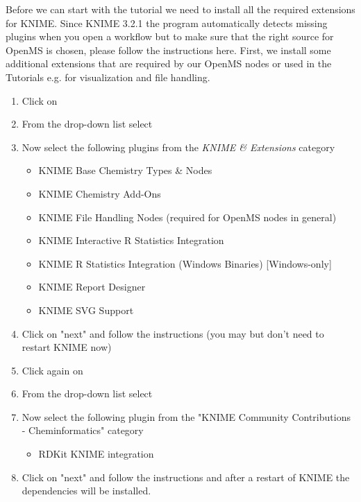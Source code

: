 Before we can start with the tutorial we need to install all the required extensions for KNIME. Since KNIME 3.2.1 the program automatically
detects missing plugins when you open a workflow but to make sure that the right source for OpenMS is chosen, please follow the instructions here.
First, we install some additional extensions that are required by our OpenMS nodes or used in the Tutorials e.g. for visualization and file handling.
\begin{enumerate}
\item Click on 
\item From the  drop-down list select \menu{\KnimeUpdateSite}
\item Now select the following plugins from the \textit{KNIME \& Extensions} category
    \begin{itemize}
    \item KNIME Base Chemistry Types \& Nodes
    \item KNIME Chemistry Add-Ons
    \item KNIME File Handling Nodes (required for OpenMS nodes in general)
    \item KNIME Interactive R Statistics Integration
    \item KNIME R Statistics Integration (Windows Binaries) [Windows-only]
    \item KNIME Report Designer
    \item KNIME SVG Support
    \end{itemize}
\item Click on "next" and follow the instructions (you may but don't need to restart KNIME now)
\item Click again on 
\item From the  drop-down list select \\\menu{\KnimeTrustedSite}
\item Now select the following plugin from the "KNIME Community Contributions - Cheminformatics" category 	
    \begin{itemize}
    \item     RDKit KNIME integration
    \end{itemize}	
\item Click on "next" and follow the instructions and after a restart of KNIME the dependencies will be installed.
\end{enumerate}

